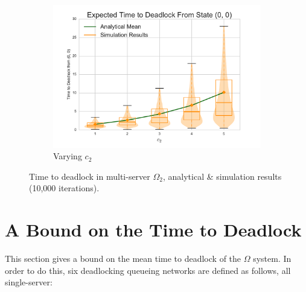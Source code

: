 \documentclass{article}
\begin{document}
\begin{figure}[!htbp]
\begin{center}
\begin{subfigure}[b]{0.34\textwidth}
    \includegraphics[width=\textwidth]{images/varyc2_2Nms}
    \caption{Varying $c_2$}
    \label{fig:2Nms_c2}
  \end{subfigure}
  \end{center}
  \caption{Time to deadlock in multi-server $\Omega_2$, analytical \& simulation results (10,000 iterations).}
  \label{fig:timestodeadlock2nodemultiserver}
\end{figure}










\section{A Bound on the Time to Deadlock}\label{sec:bound}

This section gives a bound on the mean time to deadlock of the $\Omega$ system.
In order to do this, six deadlocking queueing networks are defined as follows, all single-server:
\end{document}
